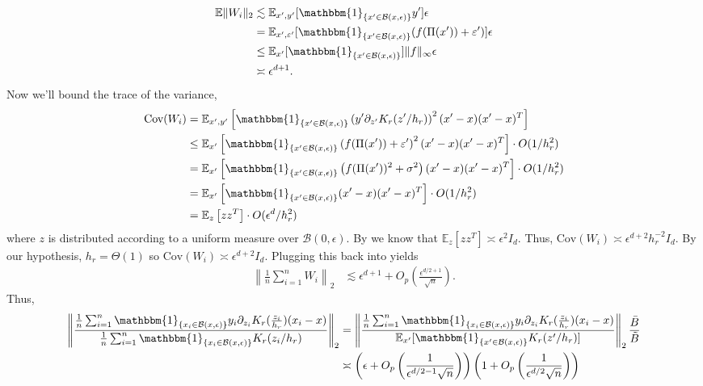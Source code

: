 \documentclass[11pt]{article}
\begin{document}
\begin{align}
    \mathbb{E}\|W_i\|_2 &\lesssim \mathbb{E}_{x', y'}[\mathbbm{1}_{\{x' \in \mathcal{B}(x, \epsilon)\}}y']\epsilon \\
    &= \mathbb{E}_{x', \varepsilon'}[\mathbbm{1}_{\{x' \in \mathcal{B}(x, \epsilon)\}}(f(\Pi(x')) + \varepsilon')]\epsilon \\
    &\leq \mathbb{E}_{x'}[\mathbbm{1}_{\{x' \in \mathcal{B}(x, \epsilon)\}}] \|f\|_{\infty}\epsilon \\
    &\asymp \epsilon^{d+1}.
\end{align}
Now we'll bound the trace of the variance,
\begin{align}
    \text{Cov}(W_i) &= \mathbb{E}_{x', y'}\left[\mathbbm{1}_{\{x' \in \mathcal{B}(x, \epsilon)\}}\left(y'\partial_{z'}K_r(z'/h_r)\right)^2(x' - x)(x' - x)^T\right] \\
    &\leq \mathbb{E}_{x'}\left[\mathbbm{1}_{\{x' \in \mathcal{B}(x, \epsilon)\}}\left(f(\Pi(x')) + \varepsilon'\right)^2(x' - x)(x' - x)^T\right] \cdot O(1/h_r^2)\\
    &= \mathbb{E}_{x'}\left[\mathbbm{1}_{\{x' \in \mathcal{B}(x, \epsilon)\}}\left(f(\Pi(x'))^2 + \sigma^2\right)(x' - x)(x' - x)^T\right] \cdot O(1/h_r^2) \\
    &= \mathbb{E}_{x'}\left[\mathbbm{1}_{\{x' \in \mathcal{B}(x, \epsilon)\}}(x' - x)(x' - x)^T\right] \cdot O(1/h_r^2) \\
    &= \mathbb{E}_{z}\left[zz^T\right] \cdot O(\epsilon^d/h_r^2)
\end{align}
where $z$ is distributed according to a uniform measure over $\mathcal{B}(0, \epsilon)$. By  we know that $\mathbb{E}_{z}\left[zz^T\right] \asymp \epsilon^2I_d$. Thus, $\text{Cov}(W_i) \asymp \epsilon^{d+2}h_r^{-2}I_d$. By our hypothesis, $h_r = \Theta(1)$ so  $\text{Cov}(W_i) \asymp \epsilon^{d+2}I_d$. Plugging this back into  yields
\begin{align}
    \left\|\frac{1}{n}\sum_{i = 1}^nW_i\right\|_2 &\lesssim \epsilon^{d+1} + O_p\left(\frac{\epsilon^{d/2 + 1}}{\sqrt{n}}\right).
\end{align}
Thus,
\begin{align}
    \left\|\frac{\frac{1}{n}\sum_{i = 1}^n\mathbbm{1}_{\{x_i \in \mathcal{B}(x, \epsilon)\}}y_i\partial_{z_i}K_r(\frac{z_i}{h_r})(x_i - x)}{\frac{1}{n}\sum_{i = 1}^n\mathbbm{1}_{\{x_i \in \mathcal{B}(x, \epsilon)\}}K_r(z_i/h_r)}\right\|_2 &= \left\|\frac{\frac{1}{n}\sum_{i = 1}^n\mathbbm{1}_{\{x_i \in \mathcal{B}(x, \epsilon)\}}y_i\partial_{z_i}K_r(\frac{z_i}{h_r})(x_i - x)}{\mathbb{E}_{x'}[\mathbbm{1}_{\{x' \in \mathcal{B}(x, \epsilon)\}}K_r(z'/h_r)]}\right\|_2\frac{\bar{B}}{\tilde{B}} \\
    &\asymp \left(\epsilon + O_p\left(\frac{1}{\epsilon^{d/2-1}\sqrt{n}}\right)\right)\left(1 + O_p\left(\frac{1}{\epsilon^{d/2}\sqrt{n}}\right)\right)
\end{align}
\end{document}
